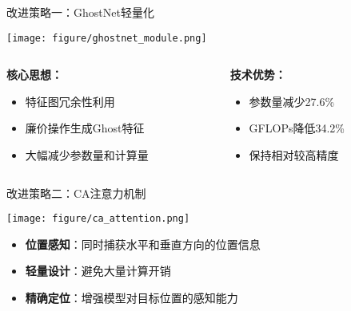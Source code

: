 \documentclass[aspectratio=169]{beamer}
\begin{document}
\begin{frame}{改进策略一：GhostNet轻量化}
    \begin{center}
        \texttt{[image: figure/ghostnet\_module.png]}
    \end{center}
    
    \begin{columns}
        \begin{column}{0.5\textwidth}
            \textbf{核心思想：}
            \begin{itemize}
                \item 特征图冗余性利用
                \item 廉价操作生成Ghost特征
                \item 大幅减少参数量和计算量
            \end{itemize}
        \end{column}
        \begin{column}{0.5\textwidth}
            \textbf{技术优势：}
            \begin{itemize}
                \item 参数量减少27.6\%
                \item GFLOPs降低34.2\%
                \item 保持相对较高精度
            \end{itemize}
        \end{column}
    \end{columns}
\end{frame}

\begin{frame}{改进策略二：CA注意力机制}
    \begin{center}
        \texttt{[image: figure/ca\_attention.png]}
    \end{center}
    
    \begin{itemize}
        \item \textbf{位置感知}：同时捕获水平和垂直方向的位置信息
        \item \textbf{轻量设计}：避免大量计算开销
        \item \textbf{精确定位}：增强模型对目标位置的感知能力
    \end{itemize}
\end{frame}
\end{document}

